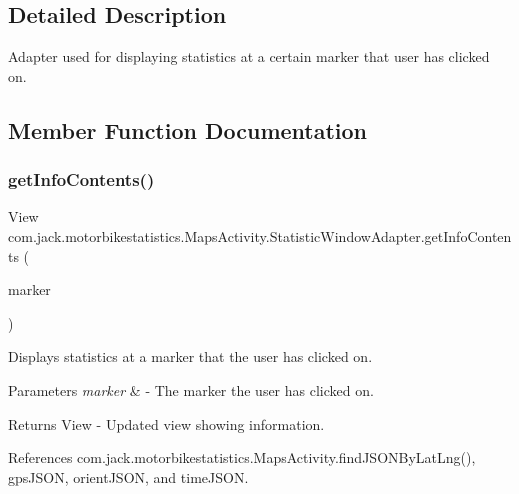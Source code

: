 \subsection{Detailed Description}
Adapter used for displaying statistics at a certain marker that user has clicked on. 

\subsection{Member Function Documentation}
\mbox{\label{classcom_1_1jack_1_1motorbikestatistics_1_1_maps_activity_1_1_statistic_window_adapter_a7430ace867de8932341d6f07674013e9}} 
\subsubsection{\texorpdfstring{get\+Info\+Contents()}{getInfoContents()}}
{\footnotesize\ttfamily View com.\+jack.\+motorbikestatistics.\+Maps\+Activity.\+Statistic\+Window\+Adapter.\+get\+Info\+Contents (\begin{DoxyParamCaption}\item[{Marker}]{marker }\end{DoxyParamCaption})\hspace{0.3cm}{\ttfamily [inline]}}



Displays statistics at a marker that the user has clicked on. 


\begin{DoxyParams}{Parameters}
{\em marker} & -\/ The marker the user has clicked on. \\
\hline
\end{DoxyParams}
\begin{DoxyReturn}{Returns}
View -\/ Updated view showing information. 
\end{DoxyReturn}


References com.\+jack.\+motorbikestatistics.\+Maps\+Activity.\+find\+J\+S\+O\+N\+By\+Lat\+Lng(), gps\+J\+S\+ON, orient\+J\+S\+ON, and time\+J\+S\+ON.


